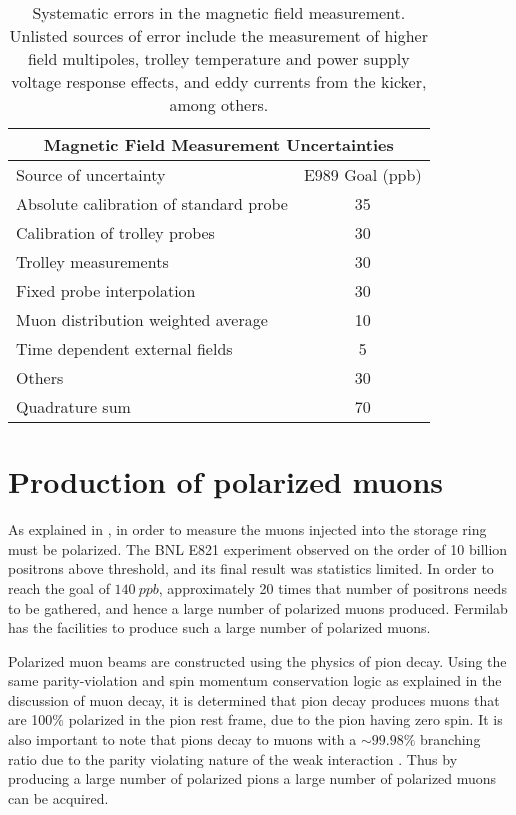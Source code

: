 \begin{table}[]
\centering
\setlength\tabcolsep{10pt}
\renewcommand{\arraystretch}{1.2}
\begin{tabular*}{.8\linewidth}{@{\extracolsep{\fill}}lc}
  \hline
    \multicolumn{2}{c}{\textbf{Magnetic Field Measurement Uncertainties}} \\
  \hline\hline
    Source of uncertainty & E989 Goal (ppb) \\
  \hline
    Absolute calibration of standard probe & 35 \\
    Calibration of trolley probes & 30 \\
    Trolley measurements & 30 \\
    Fixed probe interpolation & 30 \\
    Muon distribution weighted average & 10 \\
    Time dependent external fields & 5 \\
    Others & 30 \\
  \hline
    Quadrature sum & 70 \\
  \hline 
\end{tabular*}
\caption[Uncertainties in the magnetic field measurement]{Systematic errors in the magnetic field measurement. Unlisted sources of error include the measurement of higher field multipoles, trolley temperature and power supply voltage response effects, and eddy currents from the kicker, among others.}
\label{tab:magneticfielduncertainties}
\end{table}



\section{Production of polarized muons}
\label{sec:Accelerator}


As explained in , in order to measure \wa the muons injected into the storage ring must be polarized. The BNL E821 experiment observed on the order of 10 billion positrons above threshold, and its final result was statistics limited. In order to reach the goal of $\SI{140}{ppb}$, approximately 20 times that number of positrons needs to be gathered, and hence a large number of polarized muons produced. Fermilab has the facilities to produce such a large number of polarized muons.

Polarized muon beams are constructed using the physics of pion decay. Using the same parity-violation and spin momentum conservation logic as explained in the discussion of muon decay, it is determined that pion decay produces muons that are 100\% polarized in the pion rest frame, due to the pion having zero spin. It is also important to note that pions decay to muons with a $\sim 99.98\%$ branching ratio due to the parity violating nature of the weak interaction \cite{PDG}. Thus by producing a large number of polarized pions a large number of polarized muons can be acquired.


